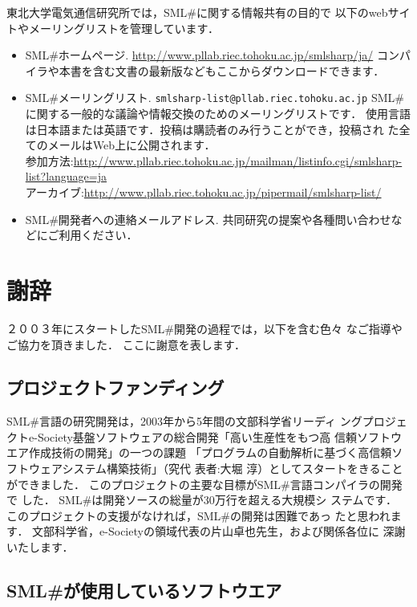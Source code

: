 \documentclass{jbook}
\newcommand{\smlsharp}{SML\#}
\newcommand{\smlsharpSize}{30万}
\begin{document}
	東北大学電気通信研究所では，\smlsharp{}に関する情報共有の目的で
以下のwebサイトやメーリングリストを管理しています．
\begin{itemize}
\item \smlsharp{}ホームページ.
\url{http://www.pllab.riec.tohoku.ac.jp/smlsharp/ja/}
コンパイラや本書を含む文書の最新版などもここからダウンロードできます．

\item \smlsharp{}メーリングリスト.
{\tt smlsharp-list@pllab.riec.tohoku.ac.jp}
\smlsharp{}に関する一般的な議論や情報交換のためのメーリングリストです．
使用言語は日本語または英語です．投稿は購読者のみ行うことができ，投稿され
た全てのメールはWeb上に公開されます．\\
参加方法:\url{http://www.pllab.riec.tohoku.ac.jp/mailman/listinfo.cgi/smlsharp-list?language=ja}\\
アーカイブ:\url{http://www.pllab.riec.tohoku.ac.jp/pipermail/smlsharp-list/}

\item \smlsharp{}開発者への連絡メールアドレス.
共同研究の提案や各種問い合わせなどにご利用ください．
\end{itemize}

\section{謝辞}
\label{sec:acknowledgements}

	２００３年にスタートした\smlsharp{}開発の過程では，以下を含む色々
なご指導やご協力を頂きました．
	ここに謝意を表します．
	
\subsection{プロジェクトファンディング}
	\smlsharp{}言語の研究開発は，2003年から5年間の文部科学省リーディ
ングプロジェクトe-Society基盤ソフトウェアの総合開発「高い生産性をもつ高
信頼ソフトウエア作成技術の開発」の一つの課題
「プログラムの自動解析に基づく高信頼ソフトウェアシステム構築技術」（究代
表者:大堀 淳）としてスタートをきることができました．
	このプロジェクトの主要な目標が\smlsharp{}言語コンパイラの開発で
した．
	\smlsharp{}は開発ソースの総量が\smlsharpSize{}行を超える大規模シ
ステムです．
	このプロジェクトの支援がなければ，\smlsharp{}の開発は困難であっ
たと思われます．
	文部科学省，e-Societyの領域代表の片山卓也先生，および関係各位に
深謝いたします．

\subsection{\smlsharp{}が使用しているソフトウエア}
\end{document}

